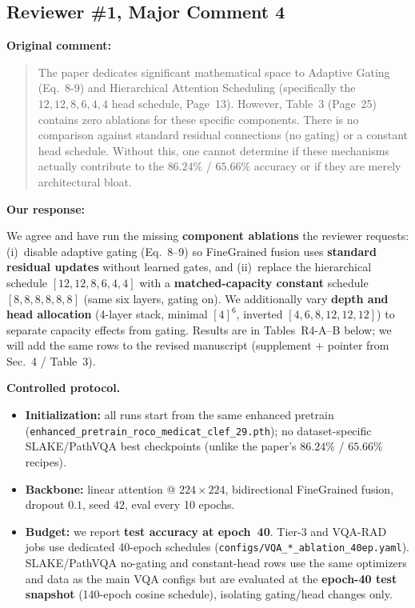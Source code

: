 %
%  

\subsection*{Reviewer \#1, Major Comment 4}

\noindent\textbf{Original comment:}
\begin{quote}
\small
The paper dedicates significant mathematical space to Adaptive Gating (Eq.~8-9)
and Hierarchical Attention Scheduling (specifically the $12,12,8,6,4,4$ head
schedule, Page~13). However, Table~3 (Page~25) contains zero ablations for
these specific components. There is no comparison against standard residual
connections (no gating) or a constant head schedule. Without this, one cannot
determine if these mechanisms actually contribute to the $86.24\%$ /
$65.66\%$ accuracy or if they are merely architectural bloat.
\end{quote}

\noindent\textbf{Our response:}

We agree and have run the missing \textbf{component ablations} the reviewer
requests: (i)~disable adaptive gating (Eq.~8--9) so FineGrained fusion uses
\textbf{standard residual updates} without learned gates, and (ii)~replace the
hierarchical schedule $[12,12,8,6,4,4]$ with a \textbf{matched-capacity constant}
schedule $[8,8,8,8,8,8]$ (same six layers, gating on). We additionally vary
\textbf{depth and head allocation} (4-layer stack, minimal $[4]^6$, inverted
$[4,6,8,12,12,12]$) to separate capacity effects from gating. Results are in
Tables~R4-A--B below; we will add the same rows to the revised manuscript
(supplement + pointer from Sec.~4 / Table~3).

\medskip
\noindent\textbf{Controlled protocol.}

\begin{itemize}\setlength{\itemsep}{2pt}
\item \textbf{Initialization:} all runs start from the same enhanced pretrain
  (\texttt{enhanced\_pretrain\_roco\_medicat\_clef\_29.pth}); no dataset-specific
  SLAKE/PathVQA best checkpoints (unlike the paper's $86.24\%$ / $65.66\%$ recipes).
\item \textbf{Backbone:} linear attention @ $224{\times}224$, bidirectional
  FineGrained fusion, dropout $0.1$, seed $42$, eval every 10 epochs.
\item \textbf{Budget:} we report \textbf{test accuracy at epoch~40}. Tier-3 and
  VQA-RAD jobs use dedicated 40-epoch schedules
  (\texttt{configs/VQA\_*\_ablation\_40ep.yaml}). SLAKE/PathVQA no-gating and
  constant-head rows use the same optimizers and data as the main VQA configs but
  are evaluated at the \textbf{epoch-40 test snapshot} (140-epoch cosine
  schedule), isolating gating/head changes only.
\end{itemize}

